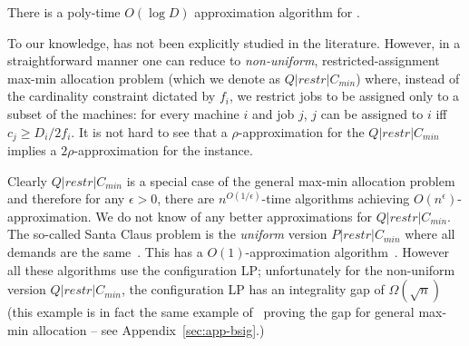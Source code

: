 \begin{theorem}\label{thm:cckp}
	There is a poly-time $O(\log D)$ approximation algorithm for \cckp.
\end{theorem}
	To our knowledge, \cckp has not been explicitly studied in the literature. %
	However, in a straightforward manner one can reduce \cckp to {\em non-uniform}, restricted-assignment max-min allocation problem (which we denote as $Q|restr|C_{min}$) where,  instead of the cardinality constraint dictated by $f_i$, we restrict jobs to be assigned only to a subset of the machines:
	for every machine $i$ and job $j$, $j$ can be assigned to $i$ iff $c_j \geq D_i/2f_i$. It is not hard to see that a $\rho$-approximation for the $Q|restr|C_{min}$ implies a $2\rho$-approximation for the \cckp instance.

Clearly $Q|restr|C_{min}$  is a special case of the general max-min allocation problem~\cite{ChakrabartyCK09} and therefore for any $\epsilon>0$, there are $n^{O(1/\epsilon)}$-time algorithms
achieving $O(n^\epsilon)$-approximation. We do not know of any better approximations for $Q|restr|C_{min}$. The so-called Santa Claus problem is the {\em uniform} version $P|restr|C_{min}$ where all demands are the same~\cite{BansalS06}. This has a $O(1)$-approximation algorithm~\cite{Feige08,AsadpourFS12,PolacekS16}. However all these algorithms use the configuration LP; unfortunately for the non-uniform version $Q|restr|C_{min}$, the configuration LP has an integrality gap of $\Omega(\sqrt{n})$ (this example is in fact the same example of~\cite{BansalS06} proving the gap for general max-min allocation -- see Appendix~\ref{sec:app-bsig}.)%




